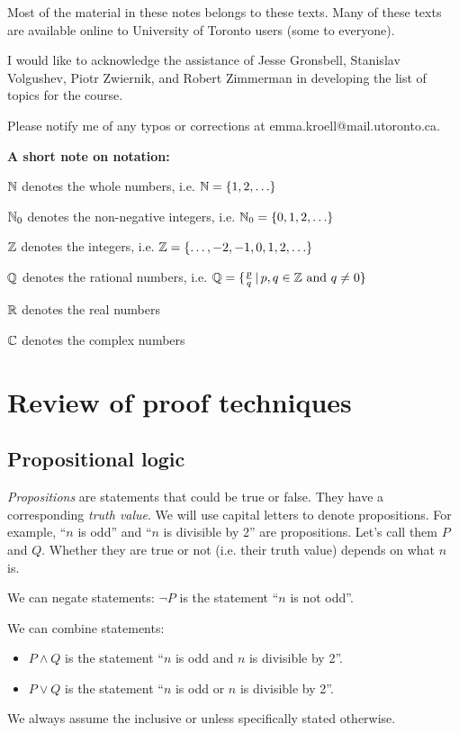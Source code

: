 \documentclass{article}
\begin{document}
Most of the material in these notes belongs to these texts. Many of these texts are available online to University of Toronto users (some to everyone).

I would like to acknowledge the assistance of Jesse Gronsbell, Stanislav Volgushev, Piotr Zwiernik, and Robert Zimmerman in developing the list of topics for the course. 

Please notify me of any typos or corrections at emma.kroell@mail.utoronto.ca.


\newpage
\tableofcontents


\newpage

{\bf A short note on notation: }

\vspace{0.5em}

${\mathbb{N}}$ denotes the whole numbers, i.e. ${\mathbb{N}} = \{1,2,\ldots \}$

${\mathbb{N}}_0$ denotes the non-negative integers, i.e. ${\mathbb{N}}_0 = \{0, 1,2,\ldots \}$

${\mathbb{Z}}$ denotes the integers, i.e. ${\mathbb{Z}} = \{ \ldots, -2,-1,0,1,2,\ldots \}$

${\mathbb{Q}}$ denotes the rational numbers, i.e. ${\mathbb{Q}} = \{ \frac{p}{q} \, | \, p, q \in {\mathbb{Z}} \text{ and } q \neq 0 \}$

${\mathbb{R}}$ denotes the real numbers

${\mathbb{C}}$ denotes the complex numbers



\section{Review of proof techniques}
\subsection{Propositional logic}

\emph{Propositions} are statements that could be true or false. They have a corresponding \emph{truth value}. We will use capital letters to denote propositions. For example, ``$n$ is odd'' and ``$n$ is divisible by 2'' are propositions. Let's call them $P$ and $Q$. Whether they are true or not (i.e. their truth value) depends on what $n$ is. 

We can  negate statements: $\neg P$ is the statement ``$n$ is not odd''.

 We can combine statements: 
 \begin{itemize}
 \item $P \wedge Q$ is the statement ``$n$ is odd and $n$ is divisible by 2''.
 \item $P \vee Q$ is the statement ``$n$ is odd or $n$ is divisible by 2''.
\end{itemize}
We always assume the inclusive or unless specifically stated otherwise.
\end{document}
